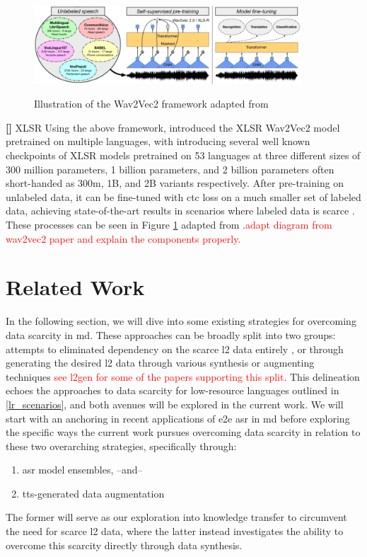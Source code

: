 \documentclass[thesis]{cluu}
\newcounter{paranum}
\newcommand{\numberedparagraph}{\par\refstepcounter{paranum}\textbf{[\theparanum] }}
\newcommand{\todo}[1]{\textcolor{red}{#1}}
\begin{document}
\begin{figure}[h]
    \includegraphics[width=10cm]{wav2vec2.png}
    \centering
    \label{fig:wav2vec2architecture}
    \caption{Illustration of the Wav2Vec2 framework adapted from \textcite{baevskiWav2vec20Framework2020a}}
\end{figure} 

\numberedparagraph{XLSR}
Using the above framework, \textcite{conneauUnsupervisedCrosslingualRepresentation2020} introduced the XLSR Wav2Vec2 model pretrained on multiple languages, with \textcite{babuXLSRSelfsupervisedCrosslingual2021} introducing several well known checkpoints of XLSR models pretrained on 53 languages at three different sizes of 300 million parameters, 1 billion parameters, and 2 billion parameters often short-handed as 300m, 1B, and 2B variants respectively. After pre-training on unlabeled data, it can be fine-tuned with \gls{ctc} loss \parencite{gravesConnectionistTemporalClassification} on a much smaller set of labeled data, achieving state-of-the-art results in scenarios where labeled data is scarce \textcite{baevskiWav2vec20Framework2020a}. These processes can be seen in Figure \ref{fig:wav2vec2architecture} adapted from \textcite{babuXLSRSelfsupervisedCrosslingual2021}.\todo{adapt diagram from wav2vec2 paper and explain the components properly.}


\chapter{Related Work}\label{ch:rw}
In the following section, we will dive into some existing strategies for overcoming data scarcity in \gls{md}. These approaches can be broadly split into two groups: attempts to eliminated dependency on the scarce \gls{l2} data entirely \parencite{korzekwaWeaklysupervisedWordlevelPronunciation2021}, or through generating the desired \gls{l2} data through various synthesis or augmenting techniques \todo{see l2gen for some of the papers supporting this split}. This delineation echoes the approaches to data scarcity for low-resource languages outlined in \ref{lr_scenarios}, and both avenues will be explored in the current work. We will start with an anchoring in recent applications of \gls{e2e} \gls{asr} in \gls{md} before exploring the specific ways the current work pursues overcoming data scarcity in relation to these two overarching strategies, specifically through: 
\begin{enumerate}
  \item \gls{asr} model ensembles,
  --and--
  \item \gls{tts}-generated data augmentation
\end{enumerate}
The former will serve as our exploration into knowledge transfer to circumvent the need for scarce \gls{l2} data, where the latter instead investigates the ability to overcome this scarcity directly through data synthesis.
\end{document}
